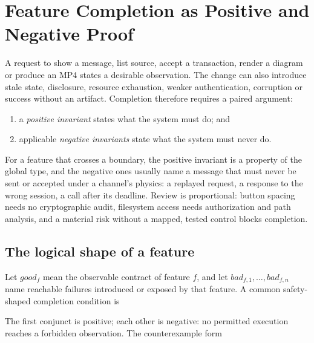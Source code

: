 \chapter{Feature Completion as Positive and Negative Proof}
\label{ch:feature-discipline}

A request to show a message, list source, accept a transaction, render a diagram
or produce an MP4 states a desirable observation. The change can also introduce
stale state, disclosure, resource exhaustion, weaker authentication, corruption
or success without an artifact. Completion therefore requires a paired argument:

\begin{enumerate}
  \item a \emph{positive invariant} states what the system must do; and
  \item applicable \emph{negative invariants} state what the system must never do.
\end{enumerate}

For a feature that crosses a boundary, the positive invariant is a property of
the global type, and the negative ones usually name a message that must never be
sent or accepted under a channel's physics: a replayed request, a response to the
wrong session, a call after its deadline. Review is proportional: button spacing
needs no cryptographic audit, filesystem access needs authorization and path
analysis, and a material risk without a mapped, tested control blocks completion.

\section{The logical shape of a feature}

Let $good_f$ mean the observable contract of feature $f$, and let
$bad_{f,1},\ldots,bad_{f,n}$ name reachable failures introduced or exposed by
that feature.  A common safety-shaped completion condition is


The first conjunct is positive; each other is negative: no permitted execution
reaches a forbidden observation. The counterexample form


